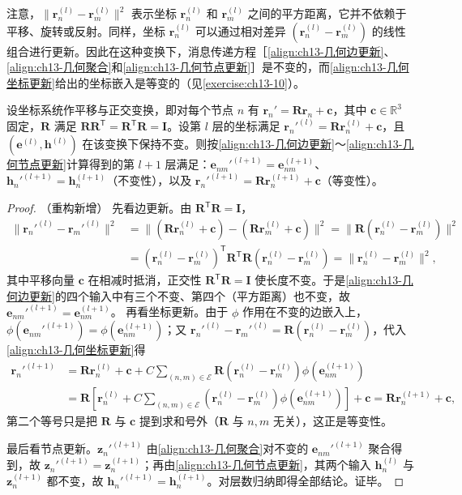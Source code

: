 \documentclass[../../main.tex]{subfiles}
\begin{document}
注意，$\|\bm{r}_n^{(l)}-\bm{r}_m^{(l)}\|^2$ 表示坐标 $\bm{r}_n^{(l)}$ 和 $\bm{r}_m^{(l)}$ 之间的平方距离，它并不依赖于平移、旋转或反射。同样，坐标 $\bm{r}_n^{(l)}$ 可以通过相对差异 $(\bm{r}_n^{(l)}-\bm{r}_m^{(l)})$ 的线性组合进行更新。因此在这种变换下，消息传递方程［\eqref{align:ch13-几何边更新}、\eqref{align:ch13-几何聚合}和\eqref{align:ch13-几何节点更新}］是不变的，而\eqref{align:ch13-几何坐标更新}给出的坐标嵌入是等变的（见\cref{exercise:ch13-10}）。

\begin{proposition}\label{proposition:ch13-几何等变性}
设坐标系统作平移与正交变换，即对每个节点 $n$ 有 $\bm{r}_n'=\bm{R}\bm{r}_n+\bm{c}$，其中 $\bm{c}\in\mathbb{R}^3$ 固定，$\bm{R}$ 满足 $\bm{R}\bm{R}^{\mathsf T}=\bm{R}^{\mathsf T}\bm{R}=\bm{I}$。设第 $l$ 层的坐标满足 $\bm{r}_n'^{(l)}=\bm{R}\bm{r}_n^{(l)}+\bm{c}$，且 $(\bm{e}^{(l)},\bm{h}^{(l)})$ 在该变换下保持不变。则按\eqref{align:ch13-几何边更新}～\eqref{align:ch13-几何节点更新}计算得到的第 $l+1$ 层满足：$\bm{e}_{nm}'^{(l+1)}=\bm{e}_{nm}^{(l+1)}$、$\bm{h}_n'^{(l+1)}=\bm{h}_n^{(l+1)}$（不变性），以及 $\bm{r}_n'^{(l+1)}=\bm{R}\bm{r}_n^{(l+1)}+\bm{c}$（等变性）。
\end{proposition}

\begin{proof}（重构新增）
先看边更新。由 $\bm{R}^{\mathsf T}\bm{R}=\bm{I}$，
\begin{align*}
\|\bm{r}_n'^{(l)}-\bm{r}_m'^{(l)}\|^2&=\|(\bm{R}\bm{r}_n^{(l)}+\bm{c})-(\bm{R}\bm{r}_m^{(l)}+\bm{c})\|^2=\|\bm{R}(\bm{r}_n^{(l)}-\bm{r}_m^{(l)})\|^2\\
&=(\bm{r}_n^{(l)}-\bm{r}_m^{(l)})^{\mathsf T}\bm{R}^{\mathsf T}\bm{R}(\bm{r}_n^{(l)}-\bm{r}_m^{(l)})=\|\bm{r}_n^{(l)}-\bm{r}_m^{(l)}\|^2,
\end{align*}
其中平移向量 $\bm{c}$ 在相减时抵消，正交性 $\bm{R}^{\mathsf T}\bm{R}=\bm{I}$ 使长度不变。于是\eqref{align:ch13-几何边更新}的四个输入中有三个不变、第四个（平方距离）也不变，故 $\bm{e}_{nm}'^{(l+1)}=\bm{e}_{nm}^{(l+1)}$。
再看坐标更新。由于 $\phi$ 作用在不变的边嵌入上，$\phi(\bm{e}_{nm}'^{(l+1)})=\phi(\bm{e}_{nm}^{(l+1)})$；又 $\bm{r}_n'^{(l)}-\bm{r}_m'^{(l)}=\bm{R}(\bm{r}_n^{(l)}-\bm{r}_m^{(l)})$，代入\eqref{align:ch13-几何坐标更新}得
\begin{align*}
\bm{r}_n'^{(l+1)}&=\bm{R}\bm{r}_n^{(l)}+\bm{c}+C\sum_{(n,m)\in\mathcal{E}}\bm{R}\left(\bm{r}_n^{(l)}-\bm{r}_m^{(l)}\right)\phi\!\left(\bm{e}_{nm}^{(l+1)}\right)\\
&=\bm{R}\left[\bm{r}_n^{(l)}+C\sum_{(n,m)\in\mathcal{E}}\left(\bm{r}_n^{(l)}-\bm{r}_m^{(l)}\right)\phi\!\left(\bm{e}_{nm}^{(l+1)}\right)\right]+\bm{c}=\bm{R}\bm{r}_n^{(l+1)}+\bm{c},
\end{align*}
第二个等号只是把 $\bm{R}$ 与 $\bm{c}$ 提到求和号外（$\bm{R}$ 与 $n,m$ 无关），这正是等变性。\par
最后看节点更新。$\bm{z}_n'^{(l+1)}$ 由\eqref{align:ch13-几何聚合}对不变的 $\bm{e}_{nm}'^{(l+1)}$ 聚合得到，故 $\bm{z}_n'^{(l+1)}=\bm{z}_n^{(l+1)}$；再由\eqref{align:ch13-几何节点更新}，其两个输入 $\bm{h}_n^{(l)}$ 与 $\bm{z}_n^{(l+1)}$ 都不变，故 $\bm{h}_n'^{(l+1)}=\bm{h}_n^{(l+1)}$。对层数归纳即得全部结论。证毕。
\end{proof}
\end{document}
